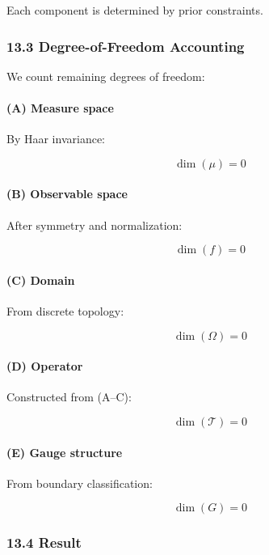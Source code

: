 \documentclass[
]{article}
\begin{document}
Each component is determined by prior constraints.

\hypertarget{degree-of-freedom-accounting}{%
\subsubsection{13.3 Degree-of-Freedom
Accounting}\label{degree-of-freedom-accounting}}

We count remaining degrees of freedom:

\hypertarget{a-measure-space}{%
\paragraph{(A) Measure space}\label{a-measure-space}}

By Haar invariance:

\[
\dim(\mu) = 0
\]

\hypertarget{b-observable-space}{%
\paragraph{(B) Observable space}\label{b-observable-space}}

After symmetry and normalization:

\[
\dim(f) = 0
\]

\hypertarget{c-domain}{%
\paragraph{(C) Domain}\label{c-domain}}

From discrete topology:

\[
\dim(\Omega) = 0
\]

\hypertarget{d-operator}{%
\paragraph{(D) Operator}\label{d-operator}}

Constructed from (A--C):

\[
\dim(\mathcal{T}) = 0
\]

\hypertarget{e-gauge-structure}{%
\paragraph{(E) Gauge structure}\label{e-gauge-structure}}

From boundary classification:

\[
\dim(G) = 0
\]

\hypertarget{result-2}{%
\subsubsection{13.4 Result}\label{result-2}}
\end{document}
